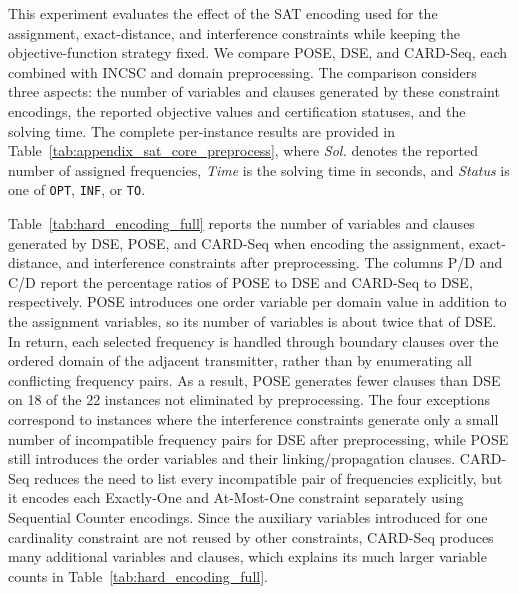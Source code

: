\documentclass[letterpaper,journal]{IEEEtran}
\begin{document}
This experiment evaluates the effect of the SAT encoding used for the assignment, exact-distance, and interference constraints while keeping the objective-function strategy fixed. We compare POSE, DSE, and CARD-Seq, each combined with INCSC and domain preprocessing. The comparison considers three aspects: the number of variables and clauses generated by these constraint encodings, the reported objective values and certification statuses, and the solving time. 
The complete per-instance results are provided in Table~\ref{tab:appendix_sat_core_preprocess}, where \textit{Sol.} denotes the reported number of assigned frequencies, \textit{Time} is the solving time in seconds, and \textit{Status} is one of \texttt{OPT}, \texttt{INF}, or \texttt{TO}.
 
Table~\ref{tab:hard_encoding_full} reports the number of variables and clauses generated by DSE, POSE, and CARD-Seq when encoding the assignment, exact-distance, and interference constraints after preprocessing. The columns P/D and C/D report the percentage ratios of POSE to DSE and CARD-Seq to DSE, respectively. POSE introduces one order variable per domain value in addition to the assignment variables, so its number of variables is about twice that of DSE. In return, each selected frequency is handled through boundary clauses over the ordered domain of the adjacent transmitter, rather than by enumerating all conflicting frequency pairs. As a result, POSE generates fewer clauses than DSE on 18 of the 22 instances not eliminated by preprocessing. The four exceptions correspond to instances where the interference constraints generate only a small number of incompatible frequency pairs for DSE after preprocessing, while POSE still introduces the order variables and their linking/propagation clauses.
CARD-Seq reduces the need to list every incompatible pair of frequencies explicitly, but it encodes each Exactly-One and At-Most-One constraint separately using Sequential Counter encodings. Since the auxiliary variables introduced for one cardinality constraint are not reused by other constraints, CARD-Seq produces many additional variables and clauses, which explains its much larger variable counts in Table~\ref{tab:hard_encoding_full}.
\end{document}
